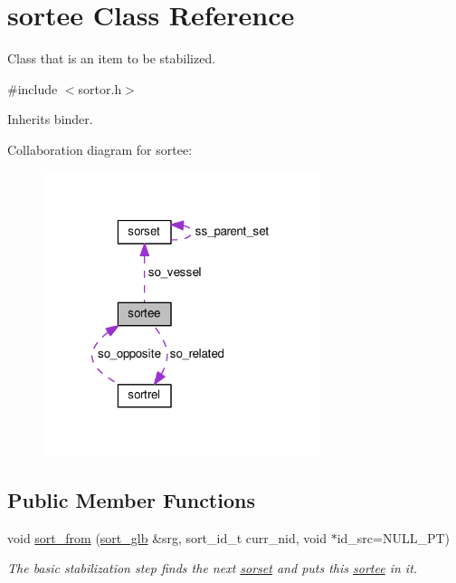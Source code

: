 \hypertarget{classsortee}{\section{sortee Class Reference}
\label{classsortee}
}


Class that is an item to be stabilized.  




{\ttfamily \#include $<$sortor.\+h$>$}



Inherits binder.



Collaboration diagram for sortee\+:\nopagebreak
\begin{figure}[H]
\begin{center}
\leavevmode
\includegraphics[width=229pt]{d8/dd4/classsortee__coll__graph}
\end{center}
\end{figure}
\subsection*{Public Member Functions}
\begin{DoxyCompactItemize}
\item 
void \hyperlink{classsortee_a5cc113e22e62dfcb3869c2786ae5345e}{sort\+\_\+from} (\hyperlink{classsort__glb}{sort\+\_\+glb} \&srg, sort\+\_\+id\+\_\+t curr\+\_\+nid, void $\ast$id\+\_\+src=N\+U\+L\+L\+\_\+\+P\+T)
\begin{DoxyCompactList}\small\item\em The basic stabilization step finds the next \hyperlink{classsorset}{sorset} and puts this \hyperlink{classsortee}{sortee} in it. \end{DoxyCompactList}\end{DoxyCompactItemize}


